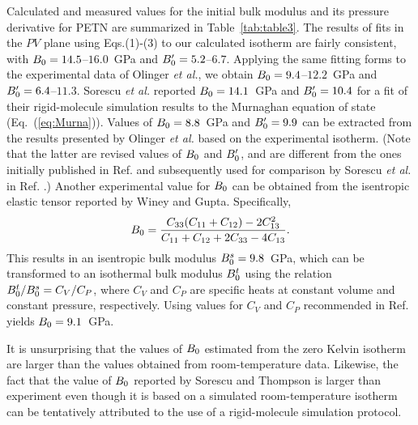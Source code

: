 \documentclass[prb,aps,nobibnotes,twocolumn,doublespace,twocolumngrid,superbib]{revtex4}
\begin{document}
Calculated and measured values for the initial bulk modulus and its
pressure derivative for PETN are summarized in Table~\ref{tab:table3}.
The results of fits in the $PV$ plane using Eqs.(1)-(3) to our
calculated isotherm are fairly consistent, with
$B_0=14.5$--$16.0$~GPa and ${B'_0}=5.2$--$6.7$.  Applying the same
fitting forms to the experimental data of Olinger {\it et
al.}\cite{Olinger_1975v62}, we obtain $B_0=9.4$--$12.2$~GPa and
${B'_0}=6.4$--$11.3$.  Sorescu {\it et al.}\cite{Sorescu_1999v103}
reported $B_0=14.1$~GPa and ${B'_0}=10.4 $ for a fit of their
rigid-molecule simulation results to the Murnaghan equation of state
(Eq.~(\ref{eq:Murna})).  Values of $B_0=8.8$~GPa and ${B'_0}=9.9$
can be extracted from the results presented by Olinger {\it et
al.}\cite{Olinger_1976} based on the experimental isotherm.  (Note
that the latter are revised values of $B_0$ and ${B'_0}$, and are
different from the ones initially published in
Ref. \cite{Olinger_1975v62} and subsequently used for comparison by
Sorescu {\it et al.}\/ in Ref. \cite{Sorescu_1999v103}.)  Another
experimental value for $B_0$ can be obtained from the isentropic
elastic tensor reported by Winey and Gupta\cite{Winey_2001v90}.
Specifically,
\begin{equation}
B_0=\frac{C_{33}(C_{11}+C_{12})-2C_{13}^2}{C_{11}+C_{12}+2C_{33}-4C_{13}}.
\end{equation}
This results in an isentropic bulk modulus $B_0^{s}=9.8$~GPa, which
can be transformed to an isothermal bulk modulus $B_0^t$ using the
relation $B_0^t/B_0^s=C_V/C_P$, where $C_V$ and $C_P$ are specific
heats at constant volume and constant pressure, respectively.  Using
values for $C_V$ and $C_P$ recommended in Ref.~\cite{Olinger_1976}
yields $B_0=9.1$~GPa.

It is unsurprising that the values of $B_0$ estimated from the zero
Kelvin isotherm are larger than the values obtained from
room-temperature data.  Likewise, the fact that the value of $B_0$
reported by Sorescu and Thompson is larger than experiment even though
it is based on a simulated room-temperature isotherm can be
tentatively attributed to the use of a rigid-molecule simulation
protocol.

\end{document}
